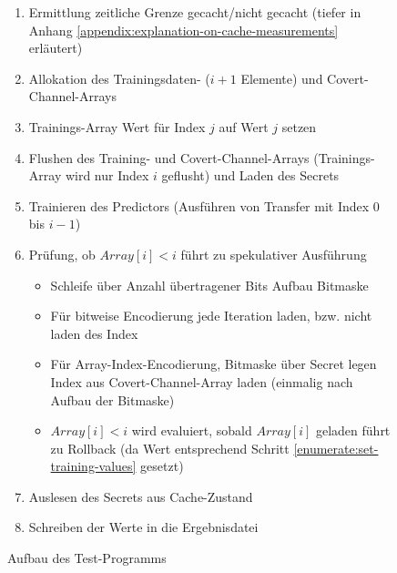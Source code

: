 \begin{figure}[H]
    \begin{enumerate}
        \item Ermittlung zeitliche Grenze gecacht/nicht gecacht (tiefer in
        Anhang \ref{appendix:explanation-on-cache-measurements} erläutert)
        \item {}Allokation des Trainingsdaten- ($i+1$ Elemente) und
        Covert-Channel-Arrays
        \item \label{enumerate:set-training-values}Trainings-Array
        Wert für Index $j$ auf Wert $j$ setzen
        \item Flushen des Training- und Covert-Channel-Arrays
        (Trainings-Array wird nur Index $i$ geflusht) und Laden des Secrets
        \item Trainieren des Predictors (Ausführen von Transfer mit Index
        $0$ bis $i-1$)
        \item \label{enumerate:transient-function}Prüfung, ob
        $Array[i]<i$ führt zu spekulativer Ausführung
        \begin{itemize}
            \item {}Schleife über Anzahl übertragener
            Bits \textrightarrow\space Aufbau Bitmaske
            \item Für bitweise Encodierung jede Iteration laden, bzw. nicht
            laden des Index
            \item Für Array-Index-Encodierung, Bitmaske über Secret legen
            \textrightarrow\space Index aus Covert-Channel-Array laden
            (einmalig nach Aufbau der Bitmaske)
            \item $Array[i]<i$ wird evaluiert, sobald $Array[i]$ geladen
            \textrightarrow\space führt zu Rollback (da Wert
            entsprechend
            Schritt \ref{enumerate:set-training-values} gesetzt)
        \end{itemize}
        \item {} Auslesen des Secrets aus Cache-Zustand
        \item Schreiben der Werte in die Ergebnisdatei
    \end{enumerate}
    \caption{Aufbau des Test-Programms\label{figure:test-programm-steps}}
\end{figure}

